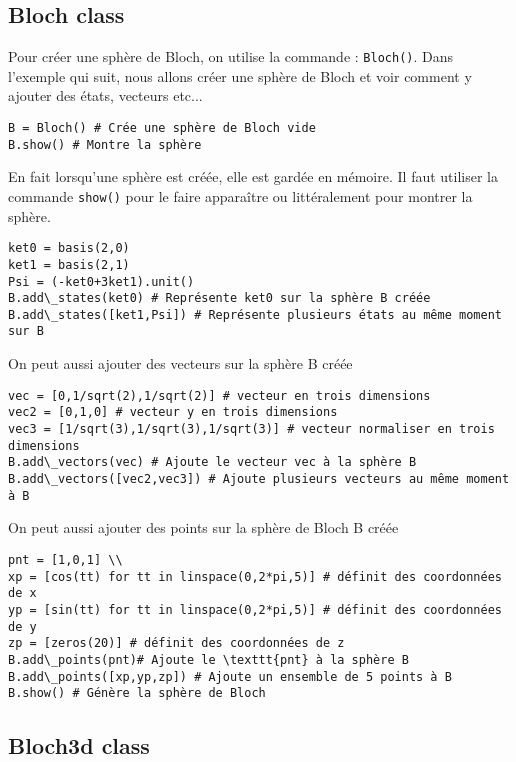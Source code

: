 \begin{itemize}
\subsection{Bloch class}

Pour créer une sphère de Bloch, on utilise la commande : \texttt{Bloch()}. Dans 
l'exemple qui suit, nous allons créer une sphère de Bloch et voir comment y 
ajouter des états, vecteurs etc...\\
\begin{lstlisting}
B = Bloch() # Crée une sphère de Bloch vide
B.show() # Montre la sphère
\end{lstlisting}
En fait lorsqu'une sphère est créée, elle est gardée en mémoire. Il faut 
utiliser la commande \texttt{show()} pour le faire apparaître ou littéralement 
pour montrer la sphère.\\
\begin{lstlisting}
ket0 = basis(2,0)
ket1 = basis(2,1)
Psi = (-ket0+3ket1).unit()
B.add\_states(ket0) # Représente ket0 sur la sphère B créée
B.add\_states([ket1,Psi]) # Représente plusieurs états au même moment sur B
\end{lstlisting}
On peut aussi ajouter des vecteurs sur la sphère B créée \\
\begin{lstlisting}
vec = [0,1/sqrt(2),1/sqrt(2)] # vecteur en trois dimensions
vec2 = [0,1,0] # vecteur y en trois dimensions
vec3 = [1/sqrt(3),1/sqrt(3),1/sqrt(3)] # vecteur normaliser en trois 
dimensions
B.add\_vectors(vec) # Ajoute le vecteur vec à la sphère B
B.add\_vectors([vec2,vec3]) # Ajoute plusieurs vecteurs au même moment à B
\end{lstlisting}
On peut aussi ajouter des points sur la sphère de Bloch B créée\\
\begin{lstlisting}
pnt = [1,0,1] \\
xp = [cos(tt) for tt in linspace(0,2*pi,5)] # définit des coordonnées de x
yp = [sin(tt) for tt in linspace(0,2*pi,5)] # définit des coordonnées de y
zp = [zeros(20)] # définit des coordonnées de z
B.add\_points(pnt)# Ajoute le \texttt{pnt} à la sphère B
B.add\_points([xp,yp,zp]) # Ajoute un ensemble de 5 points à B
B.show() # Génère la sphère de Bloch
\end{lstlisting}

\subsection{Bloch3d class}


\end{itemize}
